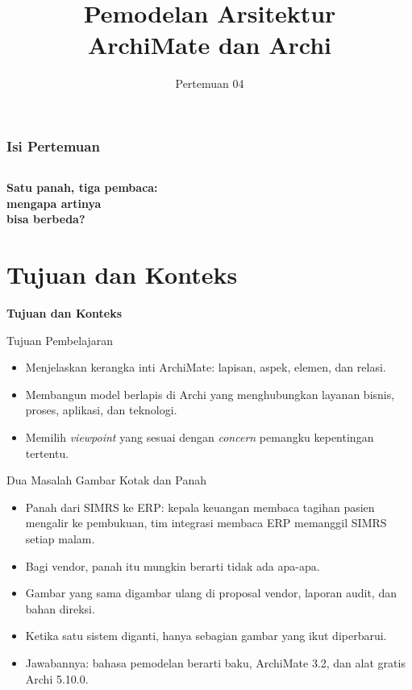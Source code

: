 \documentclass[aspectratio=169, table, 12pt]{beamer}
\title{\Huge Pemodelan Arsitektur\\ \vspace{10pt} ArchiMate dan Archi}
\date{Pertemuan 04}
\begin{document}
\frame{\titlepage}

\begin{frame}
  \frametitle{Isi Pertemuan}
  \vspace{14pt}
  \begin{columns}[t]
    {\small\tableofcontents[sections={1-3}]}

    {\small\tableofcontents[sections={4-6}]}
  \end{columns}
\end{frame}

\begin{frame}{\hfill}
  \centering
  \Huge{\textbf{Satu panah, tiga pembaca:\\mengapa artinya\\bisa berbeda?}}
\end{frame}

\section{Tujuan dan Konteks}

\begin{frame}{\hfill}
  \centering
  \Huge{\textbf{Tujuan dan Konteks}}
\end{frame}

\begin{frame}{{\Large Tujuan Pembelajaran}}
  \vspace{10pt}
  \begin{itemize}
    \item Menjelaskan kerangka inti ArchiMate: lapisan, aspek, elemen, dan relasi.
    \item Membangun model berlapis di Archi yang menghubungkan layanan bisnis, proses, aplikasi, dan
          teknologi.
    \item Memilih \textit{viewpoint} yang sesuai dengan \textit{concern} pemangku kepentingan tertentu.
  \end{itemize}
\end{frame}

\begin{frame}{{\Large Dua Masalah Gambar Kotak dan Panah}}
  \vspace{6pt}
  \small
  \begin{itemize}
    \item Panah dari SIMRS ke ERP: kepala keuangan membaca tagihan pasien mengalir ke pembukuan, tim
          integrasi membaca ERP memanggil SIMRS setiap malam.
    \item Bagi vendor, panah itu mungkin berarti tidak ada apa-apa.
    \item Gambar yang sama digambar ulang di proposal vendor, laporan audit, dan bahan direksi.
    \item Ketika satu sistem diganti, hanya sebagian gambar yang ikut diperbarui.
    \item Jawabannya: bahasa pemodelan berarti baku, ArchiMate 3.2, dan alat gratis Archi 5.10.0.
  \end{itemize}
\end{frame}
\end{document}
